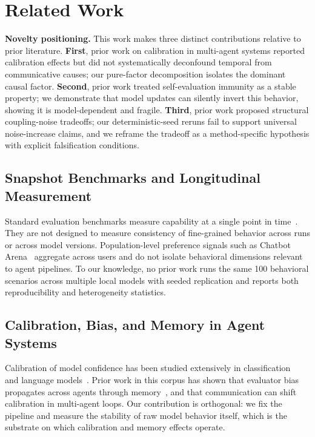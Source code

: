 \documentclass[11pt]{article}
\begin{document}
\section{Related Work}
\textbf{Novelty positioning.} This work makes three distinct contributions relative to prior literature. \textbf{First}, prior work on calibration in multi-agent systems reported calibration effects but did not systematically deconfound temporal from communicative causes; our pure-factor decomposition isolates the dominant causal factor. \textbf{Second}, prior work treated self-evaluation immunity as a stable property; we demonstrate that model updates can silently invert this behavior, showing it is model-dependent and fragile. \textbf{Third}, prior work proposed structural coupling-noise tradeoffs; our deterministic-seed reruns fail to support universal noise-increase claims, and we reframe the tradeoff as a method-specific hypothesis with explicit falsification conditions.


\label{sec:related}

\subsection{Snapshot Benchmarks and Longitudinal Measurement}

Standard evaluation benchmarks measure capability at a single point in
time~\citep{hendrycks2021mmlu,liang2022helm,chen2021humaneval}. They are
not designed to measure consistency of fine-grained behavior across runs or
across model versions. Population-level preference signals such as Chatbot
Arena~\citep{chiang2024chatbot} aggregate across users and do not isolate
behavioral dimensions relevant to agent pipelines. To our knowledge, no
prior work runs the same 100 behavioral scenarios across multiple local
models with seeded replication and reports both reproducibility and
heterogeneity statistics.

\subsection{Calibration, Bias, and Memory in Agent Systems}

Calibration of model confidence has been studied extensively in
classification~\citep{guo2017calibration} and language
models~\citep{kadavath2022language}. Prior work in this corpus has shown
that evaluator bias propagates across agents through
memory~\citep{liu2026memorycontagion}, and that communication can shift
calibration in multi-agent loops. Our contribution is orthogonal: we fix
the pipeline and measure the stability of raw model behavior itself, which
is the substrate on which calibration and memory effects operate.
\end{document}
